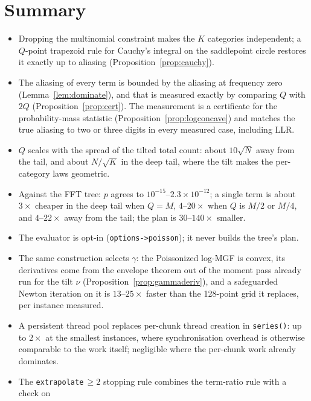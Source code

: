 \documentclass[11pt]{article}
\begin{document}
\section{Summary}
\label{sec:summary}

\begin{itemize}
  \item Dropping the multinomial constraint makes the $K$ categories independent; a $Q$-point
        trapezoid rule for Cauchy's integral on the saddlepoint circle restores it exactly up to
        aliasing (Proposition~\ref{prop:cauchy}).
  \item The aliasing of every term is bounded by the aliasing at frequency zero
        (Lemma~\ref{lem:dominate}), and that is measured exactly by comparing $Q$ with $2Q$
        (Proposition~\ref{prop:cert}). The measurement is a certificate for the probability-mass
        statistic (Proposition~\ref{prop:logconcave}) and matches the true aliasing to two or three digits in
        every measured case, including LLR.
  \item $Q$ scales with the spread of the tilted total count: about $10\sqrt N$ away from the tail,
        and about $N/\sqrt K$ in the deep tail, where the tilt makes the per-category laws
        geometric.
  \item Against the FFT tree: $p$ agrees to $10^{-15}$--$2.3\times10^{-12}$; a single term is about
        $3\times$ cheaper in the deep tail when $Q=M$, $4$--$20\times$ when $Q$ is $M/2$ or $M/4$, and
        $4$--$22\times$ away from the tail; the plan is $30$--$140\times$ smaller.
  \item The evaluator is opt-in (\texttt{options->poisson}); it never builds the tree's plan.
  \item The same construction selects $\gamma$: the Poissonized log-MGF is convex, its derivatives
        come from the envelope theorem out of the moment pass already run for the tilt $\nu$
        (Proposition~\ref{prop:gammaderiv}), and a safeguarded Newton iteration on it is
        $13$--$25\times$ faster than the 128-point grid it replaces, per instance measured.
  \item A persistent thread pool replaces per-chunk thread creation in \texttt{series()}: up to
        $2\times$ at the smallest instances, where synchronisation overhead is otherwise comparable
        to the work itself; negligible where the per-chunk work already dominates.
  \item The \texttt{extrapolate}$\,\ge2$ stopping rule combines the term-ratio rule with a check on

\end{itemize}
\end{document}
